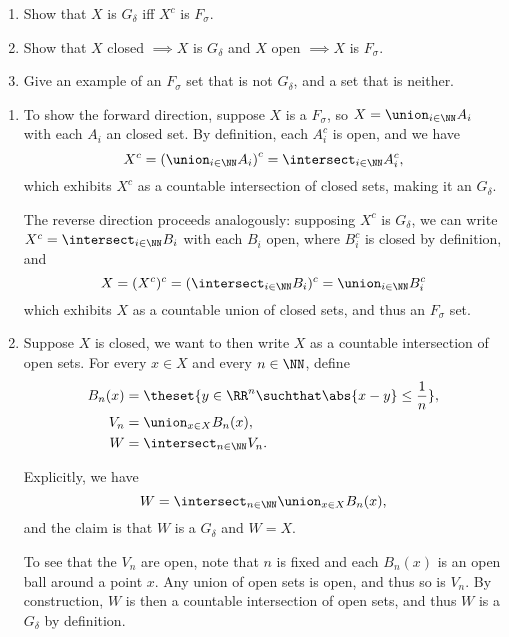 \begin{problem}\hfill
  \begin{enumerate}
    \item Show that $X$ is $G_\delta$ iff $X^c$ is $F_\sigma$.
    \item Show that $X$ closed $\implies X$ is $G_\delta$ and $X$ open $\implies X$ is $F_\sigma$.
    \item Give an example of an $F_\sigma$ set that is not $G_\delta$, and a set that is neither.
  \end{enumerate}
\end{problem}


\begin{solution}\hfill
\begin{enumerate}
\item To show the forward direction, suppose $X$ is a $F_\sigma$, so $X = \union_{i\in\NN} A_i$ with each $A_i$ an closed set. By definition, each $A_i^c$ is open, and we have
$$
X^c = \left( \union_{i\in \NN}A_i \right)^c = \intersect_{i\in\NN} A_i^c,
$$
which exhibits $X^c$ as a countable intersection of closed sets, making it an $G_\delta$.

The reverse direction proceeds analogously: supposing $X^c$ is $G_\delta$, we can write $X^c = \intersect_{i\in\NN} B_i$ with each $B_i$ open, where $B_i^c$ is closed by definition, and
$$
X = (X^c)^c = (\intersect_{i\in \NN} B_i)^c = \union_{i\in\NN} B_i^c
$$
which exhibits $X$ as a countable union of closed sets, and thus an $F_\sigma$ set.

\item Suppose $X$ is closed, we want to then write $X$ as a countable intersection of open sets.
    For every $x\in X$ and every $n\in \NN$, define
    \[
    \begin{align*}
      B_n(x) &= \theset{y\in \RR^n \suchthat \abs{x-y} \leq \frac 1 n}, \\
      V_n &= \union_{x\in X} B_n(x), \\
      W &= \intersect_{n \in \NN} V_n
    .\end{align*}
    \]

  Explicitly, we have
  $$
  W = \intersect_{n\in \NN} \union_{x\in X} B_n(x),
  $$
  and the claim is that $W$ is a $G_\delta$ and $W = X$.

  To see that the $V_n$ are open, note that $n$ is fixed and each $B_n(x)$ is an open ball around a point $x$. Any union of open sets is open, and thus so is $V_n$. By construction, $W$ is then a countable intersection of open sets, and thus $W$ is a $G_\delta$ by definition.


\end{enumerate}
\end{solution}
